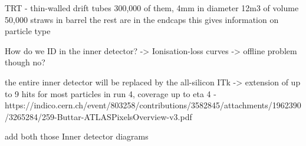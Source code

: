 TRT - thin-walled drift tubes
    300,000 of them, 4mm in diameter
    12m3 of volume
    50,000 straws in barrel
    the rest are in the endcaps
    this gives information on particle type

    
How do we ID in the inner detector? -> Ionisation-loss curves -> offline problem though no?


the entire inner detector will be replaced by the all-silicon ITk -> extension of up to 9 hits for most particles in run 4, coverage up to eta 4 - https://indico.cern.ch/event/803258/contributions/3582845/attachments/1962390/3265284/259-Buttar-ATLASPixelsOverview-v3.pdf

add both those Inner detector diagrams

